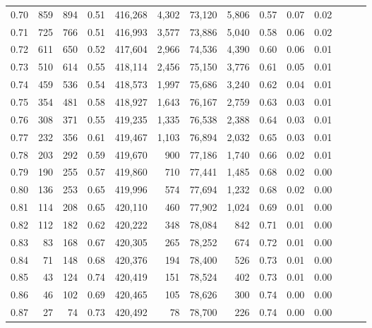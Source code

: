 \begin{tabular}{rrrrrrrrrrrrrr}
0.70 &     859 &    894 &  0.51 &  416,268 &    4,302 &  73,120 &   5,806 &  0.57 &  0.07 &      0.02 \\
0.71 &     725 &    766 &  0.51 &  416,993 &    3,577 &  73,886 &   5,040 &  0.58 &  0.06 &      0.02 \\
0.72 &     611 &    650 &  0.52 &  417,604 &    2,966 &  74,536 &   4,390 &  0.60 &  0.06 &      0.01 \\
0.73 &     510 &    614 &  0.55 &  418,114 &    2,456 &  75,150 &   3,776 &  0.61 &  0.05 &      0.01 \\
0.74 &     459 &    536 &  0.54 &  418,573 &    1,997 &  75,686 &   3,240 &  0.62 &  0.04 &      0.01 \\
0.75 &     354 &    481 &  0.58 &  418,927 &    1,643 &  76,167 &   2,759 &  0.63 &  0.03 &      0.01 \\
0.76 &     308 &    371 &  0.55 &  419,235 &    1,335 &  76,538 &   2,388 &  0.64 &  0.03 &      0.01 \\
0.77 &     232 &    356 &  0.61 &  419,467 &    1,103 &  76,894 &   2,032 &  0.65 &  0.03 &      0.01 \\
0.78 &     203 &    292 &  0.59 &  419,670 &      900 &  77,186 &   1,740 &  0.66 &  0.02 &      0.01 \\
0.79 &     190 &    255 &  0.57 &  419,860 &      710 &  77,441 &   1,485 &  0.68 &  0.02 &      0.00 \\
0.80 &     136 &    253 &  0.65 &  419,996 &      574 &  77,694 &   1,232 &  0.68 &  0.02 &      0.00 \\
0.81 &     114 &    208 &  0.65 &  420,110 &      460 &  77,902 &   1,024 &  0.69 &  0.01 &      0.00 \\
0.82 &     112 &    182 &  0.62 &  420,222 &      348 &  78,084 &     842 &  0.71 &  0.01 &      0.00 \\
0.83 &      83 &    168 &  0.67 &  420,305 &      265 &  78,252 &     674 &  0.72 &  0.01 &      0.00 \\
0.84 &      71 &    148 &  0.68 &  420,376 &      194 &  78,400 &     526 &  0.73 &  0.01 &      0.00 \\
0.85 &      43 &    124 &  0.74 &  420,419 &      151 &  78,524 &     402 &  0.73 &  0.01 &      0.00 \\
0.86 &      46 &    102 &  0.69 &  420,465 &      105 &  78,626 &     300 &  0.74 &  0.00 &      0.00 \\
0.87 &      27 &     74 &  0.73 &  420,492 &       78 &  78,700 &     226 &  0.74 &  0.00 &      0.00 \\

\end{tabular}
